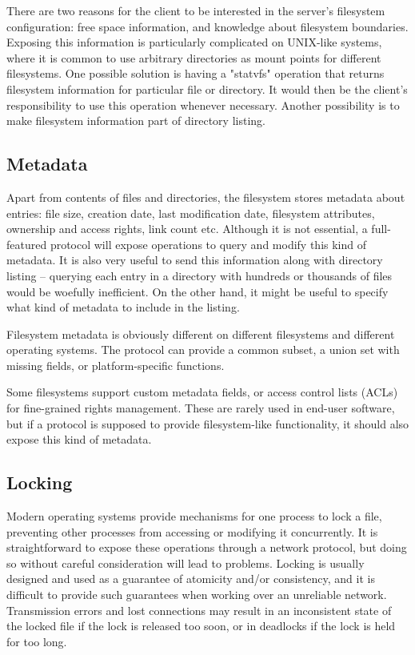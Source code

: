 There are two reasons for the client to be interested in the server's filesystem configuration: free space
information, and knowledge about filesystem boundaries. Exposing this information is particularly complicated
on UNIX-like systems, where it is common to use arbitrary directories as mount points for different
filesystems. One possible solution is having a "statvfs"\cite{statvfs} operation that returns filesystem
information for particular file or directory. It would then be the client's responsibility to use this
operation whenever necessary. Another possibility is to make filesystem information part of directory listing.

\subsection{Metadata}

Apart from contents of files and directories, the filesystem stores metadata about entries: file size,
creation date, last modification date, filesystem attributes, ownership and access rights, link count etc.
Although it is not essential, a full-featured protocol will expose operations to query and modify this kind of
metadata. It is also very useful to send this information along with directory listing -- querying each entry
in a directory with hundreds or thousands of files would be woefully inefficient. On the other hand, it might
be useful to specify what kind of metadata to include in the listing.

Filesystem metadata is obviously different on different filesystems and different operating systems. The
protocol can provide a common subset, a union set with missing fields, or platform-specific functions.

Some filesystems support custom metadata fields, or access control lists (ACLs) for fine-grained rights
management. These are rarely used in end-user software, but if a protocol is supposed to provide
filesystem-like functionality, it should also expose this kind of metadata.

\subsection{Locking}

Modern operating systems provide mechanisms for one process to lock a file, preventing other processes from
accessing or modifying it concurrently. It is straightforward to expose these operations through a network
protocol, but doing so without careful consideration will lead to problems. Locking is usually designed and
used as a guarantee of atomicity and/or consistency, and it is difficult to provide such guarantees when
working over an unreliable network. Transmission errors and lost connections may result in an inconsistent
state of the locked file if the lock is released too soon, or in deadlocks if the lock is held for too long.

